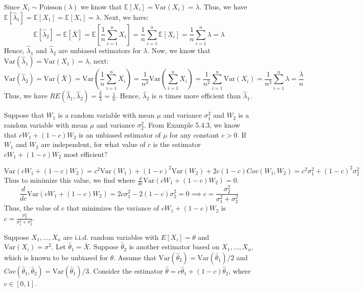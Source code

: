 \documentclass{article}
\newcommand{\E}{\mathbb{E}}
\newcommand{\V}{\text{Var}}
\begin{document}
\begin{probset}
\begin{prob}[\textbf{5.4.20}]
    \begin{soln}
        Since $X_i \sim \text{Poisson}(\lambda)$ we know that $\E[X_i] = \V(X_i) = \lambda$. Thus, we have $\E[\hat\lambda_1] = \E[X_1] = \E[X_i] = \lambda$. Next, we have:
        \[
            \E[\hat\lambda_2] = \E[\bar X] = \E\left[ \frac{1}{n} \sum_{i=1}^n X_i \right] = \frac{1}{n} \sum_{i=1}^n \E[X_i] = \frac{1}{n} \sum_{i=1}^n \lambda = \lambda
        \]
        Hence, $\hat\lambda_1$ and $\hat\lambda_2$ are unbiased estimators for $\lambda$. Now, we know that $\V(\hat\lambda_1) = \V(X_1) = \lambda$, next:
        \[
            \V(\hat\lambda_2) = \V(\bar X) = \V\left( \frac{1}{n} \sum_{i=1}^n X_i \right) = \frac{1}{n^2} \V\left( \sum_{i=1}^n X_i \right) = \frac{1}{n^2} \sum_{i=1}^n \V(X_i) = \frac{1}{n^2} \sum_{i=1}^n \lambda = \frac{\lambda}{n}
        \]
        Thus, we have $RE(\hat\lambda_1, \hat\lambda_2) = \frac{\frac{\lambda}{n}}{\lambda} = \frac{1}{n}$. Hence, $\hat\lambda_2$ is $n$ times more efficient than $\hat\lambda_1$.
    \end{soln}
\end{prob}

\begin{prob}[\textbf{5.4.22}]
    Suppose that $W_1$ is a random variable with mean $\mu$ and variance $\sigma^2_1$ and $W_2$ is a random variable with mean $\mu$ and variance $\sigma^2_2$. From Example 5.4.3, we know that $cW_1 + (1 - c)W_2$ is an unbiased estimator of $\mu$ for any constant $c > 0$. If $W_1$ and $W_2$ are independent, for what value of $c$ is the estimator $cW_1 + (1 - c)W_2$ most efficient?

    \begin{soln}
        \[
            \V(cW_1 + (1 - c)W_2) = c^2\V(W_1) + (1 - c)^2\V(W_2) + 2c(1 - c)Cov(W_1, W_2) = c^2\sigma^2_1 + (1 - c)^2\sigma^2_2
        \]
        Thus to minimize this value, we find where $\frac{d}{dc} \V(cW_1 + (1 - c)W_2) = 0$.
        \[
            \frac{d}{dc} \V(cW_1 + (1 - c)W_2) = 2c\sigma^2_1 - 2(1 - c)\sigma^2_2 = 0 \implies c = \frac{\sigma^2_2}{\sigma^2_1 + \sigma^2_2}
        \]
        Thus, the value of $c$ that minimizes the variance of $cW_1 + (1 - c)W_2$ is $c = \frac{\sigma^2_2}{\sigma^2_1 + \sigma^2_2}$.
    \end{soln}
\end{prob}

\newpage

\begin{prob}
    Suppose $X_1, \ldots, X_n$ are i.i.d. random variables with $E[X_i] = \theta$ and $\V(X_i) = \sigma^2$. Let $\hat{\theta}_1 = \bar{X}$. Suppose $\hat{\theta}_2$ is another estimator based on $X_1, \ldots, X_n$, which is known to be unbiased for $\theta$. Assume that $\V(\hat{\theta}_2) = \V(\hat{\theta}_1)/2$ and $Cov(\hat{\theta}_1, \hat{\theta}_2) = \V(\hat{\theta}_1)/3$. Consider the estimator $\hat{\theta} = c\hat{\theta}_1 + (1 - c)\hat{\theta}_2$, where $c \in [0, 1]$.


\end{prob}
\end{probset}
\end{document}
